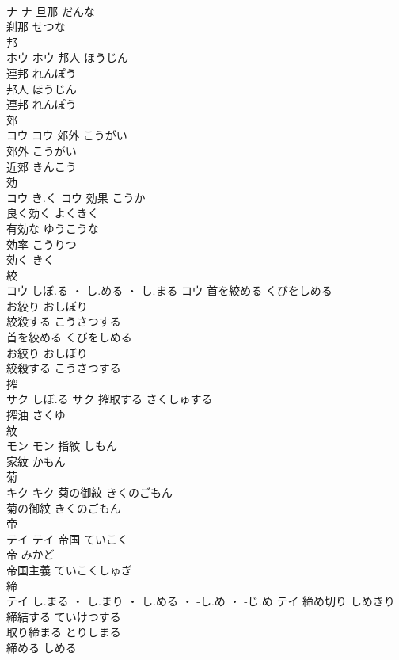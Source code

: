 \documentclass[8pt]{extreport}
\begin{document}
\begin{CJK}{UTF8}{min}
\\	ナ		ナ	旦那	だんな	
\\	刹那	せつな	
\\	邦	
\\	ホウ		ホウ	邦人	ほうじん	
\\	連邦	れんぽう	
\\	邦人	ほうじん	
\\	連邦	れんぽう	
\\	郊	
\\	コウ		コウ	郊外	こうがい	
\\	郊外	こうがい	
\\	近郊	きんこう	
\\	効	
\\	コウ	き.く	コウ	効果	こうか	
\\	良く効く	よくきく	
\\	有効な	ゆうこうな	
\\	効率	こうりつ	
\\	効く	きく	
\\	絞	
\\	コウ	しぼ.る ・ し.める ・ し.まる	コウ	首を絞める	くびをしめる	
\\	お絞り	おしぼり	
\\	絞殺する	こうさつする	
\\	首を絞める	くびをしめる	
\\	お絞り	おしぼり	
\\	絞殺する	こうさつする	
\\	搾	
\\	サク	しぼ.る	サク	搾取する	さくしゅする	
\\	搾油	さくゆ	
\\	紋	
\\	モン		モン	指紋	しもん	
\\	家紋	かもん	
\\	菊	
\\	キク		キク	菊の御紋	きくのごもん	
\\	菊の御紋	きくのごもん	
\\	帝	
\\	テイ		テイ	帝国	ていこく	
\\	帝	みかど	
\\	帝国主義	ていこくしゅぎ	
\\	締	
\\	テイ	し.まる ・ し.まり ・ し.める ・ -し.め ・ -じ.め	テイ	締め切り	しめきり	
\\	締結する	ていけつする	
\\	取り締まる	とりしまる	
\\	締める	しめる	

\end{CJK}
\end{document}
